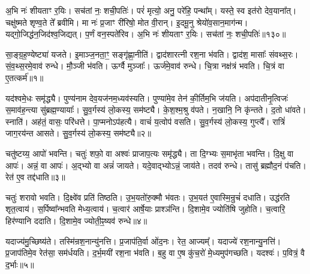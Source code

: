 अ॒भि नः॑ शीयताꣳ र॒यिः।
सच॑तां नः॒ शची॒पतिः॑।
परं॑ मृत्यो॒ अनु॒ परे॑हि॒ पन्था᳚म्।
यस्ते॒ स्व इत॑रो देव॒याना᳚त्।
चक्षु॑ष्मते शृण्व॒ते ते᳚ ब्रवीमि।
मा नः॑ प्र॒जाꣳ री॑रिषो॒ मोत वी॒रान्।
इ॒दमू॒नु श्रेयो॑व॒सान॒माग॑न्म।
यद्गो॒जिद्ध॑न॒जिद॑श्व॒जिद्यत्।
प॒र्णं वन॒स्पते॑रिव।
अ॒भि नः॑ शीयताꣳ र॒यिः।
सच॑तां नः॒ शची॒पतिः॑॥१३०॥\ip\anuvakamend[वन॒स्पता॑व॒द्भ्यो लो॒का द॑धिरे॒ तेज॑ इन्द्रि॒यं धामा॑शीमहीवा॒भिनः॑ शीयताꣳ र॒यिरेकं॑ च]


\clearpage
{}
\setcounter{anuvakam}{0}

सा॒ङ्ग्र॒ह॒ण्येष्ट्या॑ यजते।
इ॒माञ्ज॒नता॒ꣳ॒ सङ्गृ॑ह्णा॒नीति॑।
द्वाद॑शारत्नी रश॒ना भ॑वति।
द्वाद॑श॒ मासाः᳚ संवथ्स॒रः।
सं॒व॒थ्स॒रमे॒वाव॑ रुन्धे।
मौ॒ञ्जी भ॑वति।
ऊर्ग्वै मुञ्जाः᳚।
ऊर्ज॑\-मे॒वाव॑ रुन्धे।
चि॒त्रा नक्ष॑त्रं भवति।
चि॒त्रं वा ए॒तत्कर्म॑॥१॥\ip

यद॑श्वमे॒धः समृ॑द्ध्यै।
पुण्य॑नाम देव॒यज॑नम॒ध्यव॑स्यति।
पुण्या॑मे॒व तेन॑ की॒र्तिम॒भि ज॑यति।
अप॑दातीनृ॒त्विजः॑ स॒माव॑ह॒न्त्या सु॑ब्रह्म॒ण्यायाः᳚।
सु॒व॒र्गस्य॑ लो॒कस्य॒ सम॑ष्ट्यै।
के॒श॒श्म॒श्रु व॑पते।
न॒खानि॒ नि कृ॑न्तते।
द॒तो धा॑वते।
स्नाति॑।
अह॑तं॒ वासः॒ परि॑धत्ते।
पा॒प्मनो\-ऽप॑हत्यै।
वाचं॑ य॒त्वोप॑ वसति।
सु॒व॒र्गस्य॑ लो॒कस्य॒ गुप्त्यै᳚।
रात्रिं॑ जाग॒रय॑न्त आसते।
सु॒व॒र्गस्य॑ लो॒कस्य॒ सम॑ष्ट्यै॥२॥\ip\anuvakamend[कर्म॑ धत्ते॒ पञ्च॑ च]

चतु॑ष्टय्य॒ आपो॑ भवन्ति।
चतुः॑ शफो॒ वा अश्वः॑ प्राजाप॒त्यः समृ॑द्ध्यै।
ता दि॒ग्भ्यः स॒माभृ॑ता भवन्ति।
दि॒क्षु वा आपः॑।
अन्नं॒ वा आपः॑।
अ॒द्भ्यो वा अन्नं॑ जायते।
यदे॒वाद्भ्यो\-ऽन्नं॒ जाय॑ते।
तदव॑ रुन्धे।
तासु॑ ब्रह्मौद॒नं प॑चति।
रेत॑ ए॒व तद्द॑धाति॥३॥\ip

चतुः॑ शरावो भवति।
दि॒क्ष्वे॑व प्रति॑ तिष्ठति।
उ॒भ॒यतो॑रु॒क्मौ भ॑वतः।
उ॒भ॒यत॑ ए॒वास्मि॒न्रुचं॑ दधाति।
उद्ध॑रति शृत॒त्वाय॑।
स॒र्पिष्वा᳚न्भवति मेध्य॒त्वाय॑।
च॒त्वार॑ आर्\mbox{}षे॒याः प्राश्ञ॑न्ति।
दि॒शामे॒व ज्योति॑षि जुहोति।
च॒त्वारि॒ हिर॑ण्यानि ददाति।
दि॒शामे॒व ज्योती॒ꣴ॒ष्यव॑ रुन्धे॥४॥\ip

यदाज्य॑मु॒च्छिष्य॑ते।
तस्मि॑न्रश॒नान्यु॑नत्ति।
प्र॒जा\-प॑ति॒र्वा ओ॑द॒नः।
रेत॒ आज्यम्᳚।
यदाज्ये॑ रश॒नान्यु॒नत्ति॑।
प्र॒जा\-प॑तिमे॒व रेत॑सा॒ सम॑र्धयति।
द॒र्भ॒मयी॑ रश॒ना भ॑वति।
ब॒हु वा ए॒ष कु॑च॒रो॑ मे॒ध्यमुप॑गच्छति।
यदश्वः॑।
प॒वित्रं॒ वै द॒र्भाः॥५॥\ip

